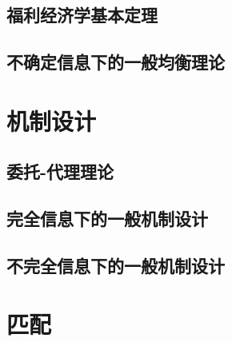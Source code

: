 \subsection{福利经济学基本定理}


\subsection{不确定信息下的一般均衡理论}

\section{机制设计}
\subsection{委托-代理理论}
\subsection{完全信息下的一般机制设计}

\subsection{不完全信息下的一般机制设计}

\section{匹配}
